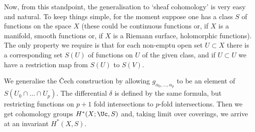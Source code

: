 Now, from this standpoint, the generalisation to ‘sheaf cohomology’ is very easy and natural. To keep things simple, for the moment suppose one has a class $S$ of functions on the space $X$ (these could be continuous functions or, if $X$ is a manifold, smooth functions or, if $X$ is a Riemann surface, holomorphic functions). The only property we require is that for each non-emptu open set $U\subset X$ there is a corresponding set $S(U)$ of functions on $U$ of the given class, and if $U\subset U$ we have a restriction map from $S(U)$ to $S(V)$.

We generalise the \v Cech construction by allowing $g_{\alpha_0,\ldots,\alpha_p}$ to be an element of $S(U_0\cap\ldots\cap U_p)$. The differential $\delta$ is defined by the same formula, but restricting functions on $p+1$ fold intersections to $p$-fold intersections.  Then we get cohomology groups $H^*(X;\Uc,S)$ and, taking limit over coverings, we arrive at an invariant $H^*(X,S)$.

